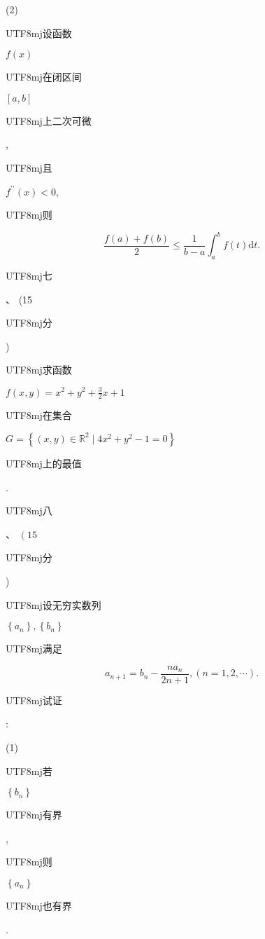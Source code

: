 \documentclass[10pt]{article}
\begin{document}
(2) \begin{CJK}{UTF8}{mj}设函数\end{CJK} $f(x)$ \begin{CJK}{UTF8}{mj}在闭区间\end{CJK} $[a, b]$ \begin{CJK}{UTF8}{mj}上二次可微\end{CJK}, \begin{CJK}{UTF8}{mj}且\end{CJK} $f^{\prime \prime}(x)<0$, \begin{CJK}{UTF8}{mj}则\end{CJK}
$$
\frac{f(a)+f(b)}{2} \leq \frac{1}{b-a} \int_{a}^{b} f(t) \mathrm{d} t .
$$
\begin{CJK}{UTF8}{mj}七\end{CJK}、 (15 \begin{CJK}{UTF8}{mj}分\end{CJK}) \begin{CJK}{UTF8}{mj}求函数\end{CJK} $f(x, y)=x^{2}+y^{2}+\frac{3}{2} x+1$ \begin{CJK}{UTF8}{mj}在集合\end{CJK} $G=\left\{(x, y) \in \mathbb{R}^{2} \mid 4 x^{2}+y^{2}-1=0\right\}$ \begin{CJK}{UTF8}{mj}上的最值\end{CJK}.

\begin{CJK}{UTF8}{mj}八\end{CJK}、 $\left(15\right.$ \begin{CJK}{UTF8}{mj}分\end{CJK}) \begin{CJK}{UTF8}{mj}设无穷实数列\end{CJK} $\left\{a_{n}\right\},\left\{b_{n}\right\}$ \begin{CJK}{UTF8}{mj}满足\end{CJK}
$$
a_{n+1}=b_{n}-\frac{n a_{n}}{2 n+1},(n=1,2, \cdots) .
$$
\begin{CJK}{UTF8}{mj}试证\end{CJK}:

(1) \begin{CJK}{UTF8}{mj}若\end{CJK} $\left\{b_{n}\right\}$ \begin{CJK}{UTF8}{mj}有界\end{CJK}, \begin{CJK}{UTF8}{mj}则\end{CJK} $\left\{a_{n}\right\}$ \begin{CJK}{UTF8}{mj}也有界\end{CJK}.
\end{document}
